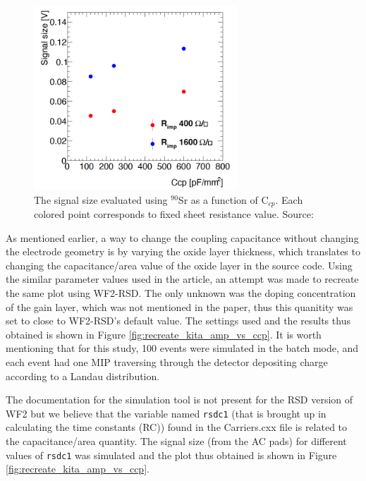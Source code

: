 \documentclass[11pt]{article}
\begin{document}
\begin{figure}[h!]
    \centering
    \includegraphics[width=3in]{Images/kita_amp_vs_ccp.png}
    \caption{The signal size evaluated using $^{90}$Sr as a function of C$_{cp}$. Each colored point corresponds to fixed sheet resistance value. Source: \cite{kita2023}}
    \label{fig:kita_amp_vs_ccp}
\end{figure}

As mentioned earlier, a way to change the coupling capacitance without changing the electrode geometry is by varying the oxide layer thickness, which translates to changing the capacitance/area value of the oxide layer in the source code. Using the similar parameter values used in the article, an attempt was made to recreate the same plot using WF2-RSD. The only unknown was the doping concentration of the gain layer, which was not mentioned in the paper, thus this quanitity was set to close to WF2-RSD's default value. The settings used and the results thus obtained is shown in Figure \ref{fig:recreate_kita_amp_vs_ccp}. It is worth mentioning that for this study, 100 events were simulated in the batch mode, and each event had one MIP traversing through the detector depositing charge according to a Landau distribution.

The documentation for the simulation tool is not present for the RSD version of WF2 but we believe that the variable named \texttt{rsdc1} (that is brought up in calculating the time constants (RC)) found in the Carriers.cxx file is related to the capacitance/area quantity. The signal size (from the AC pads) for different values of \texttt{rsdc1} was simulated and the plot thus obtained is shown in Figure \ref{fig:recreate_kita_amp_vs_ccp}.
\end{document}
